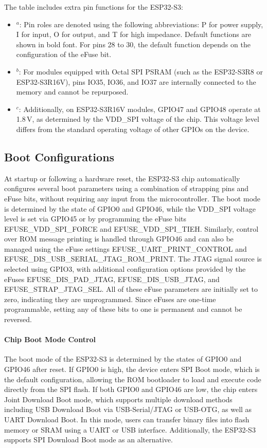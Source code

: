 The table includes extra pin functions for the ESP32-S3:
\begin{itemize}
	\item $^a$: Pin roles are denoted using the following abbreviations: P for power supply, I for input, O for output, and T for high impedance. Default functions are shown in bold font. For pins 28 to 30, the default function depends on the configuration of the eFuse bit.
	 \item $^b$: For modules equipped with Octal SPI PSRAM (such as the ESP32-S3R8 or ESP32-S3R16V), pins IO35, IO36, and IO37 are internally connected to the memory and cannot be repurposed.
	 \item $^c$: Additionally, on ESP32-S3R16V modules, GPIO47 and GPIO48 operate at 1.8\,V, as determined by the VDD\_SPI voltage of the chip. This voltage level differs from the standard operating voltage of other GPIOs on the device.
\end{itemize} 

\subsection{Boot Configurations}
At startup or following a hardware reset, the ESP32-S3 chip automatically configures several boot parameters using a combination of strapping pins and eFuse bits, without requiring any input from the microcontroller. The boot mode is determined by the state of GPIO0 and GPIO46, while the VDD\_SPI voltage level is set via GPIO45 or by programming the eFuse bits EFUSE\_VDD\_SPI\_FORCE and EFUSE\_VDD\_SPI\_TIEH. Similarly, control over ROM message printing is handled through GPIO46 and can also be managed using the eFuse settings EFUSE\_UART\_PRINT\_CONTROL and EFUSE\_DIS\_USB\_SERIAL\_JTAG\_ROM\_PRINT. The JTAG signal source is selected using GPIO3, with additional configuration options provided by the eFuses EFUSE\_DIS\_PAD\_JTAG, EFUSE\_DIS\_USB\_JTAG, and EFUSE\_STRAP\_JTAG\_SEL. All of these eFuse parameters are initially set to zero, indicating they are unprogrammed. Since eFuses are one-time programmable, setting any of these bits to one is permanent and cannot be reversed. 

\paragraph{Chip Boot Mode Control} The boot mode of the ESP32-S3 is determined by the states of GPIO0 and GPIO46 after reset. If GPIO0 is high, the device enters SPI Boot mode, which is the default configuration, allowing the ROM bootloader to load and execute code directly from the SPI flash. If both GPIO0 and GPIO46 are low, the chip enters Joint Download Boot mode, which supports multiple download methods including USB Download Boot via USB-Serial/JTAG or USB-OTG, as well as UART Download Boot. In this mode, users can transfer binary files into flash memory or SRAM using a UART or USB interface. Additionally, the ESP32-S3 supports SPI Download Boot mode as an alternative. 

